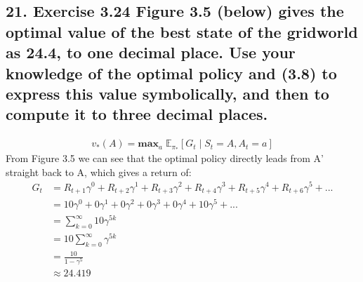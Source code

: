 \subsection*{21. Exercise 3.24 Figure 3.5 (below) gives the optimal value of the best state of the gridworld as 24.4, to one decimal place. Use your knowledge of the optimal policy and (3.8) to express this value symbolically, and then to compute it to three decimal places.}
\begin{align*}
v_* (A) = \mathbf{max}_a\; \mathbb{E}_{\pi_*}[G_t \mid S_t = A, A_t = a]
\end{align*}
From Figure 3.5 we can see that the optimal policy directly leads from A' straight back to A, which gives a return of:
\begin{align*}
G_t &= R_{t+1} \gamma^0 + R_{t+2} \gamma ^1 + R_{t+3} \gamma ^2 + R_{t+4} \gamma ^3 + R_{t+5} \gamma^4 + R_{t+6} \gamma ^5 + ... \\
&= 10\gamma^0 + 0 \gamma ^1 + 0 \gamma ^2 + 0 \gamma ^3 + 0 \gamma^4 + 10 \gamma ^5 + ...\\
&= \sum_{k = 0}^\infty 10 \gamma^{5k} \\
&= 10 \sum_{k = 0}^\infty \gamma^{5k} \\
&= \frac{10}{1 - \gamma^5} \\
&\approx  24.419
\end{align*}
\newpage


